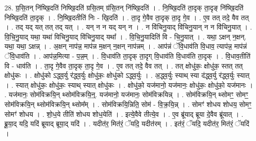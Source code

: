 \documentclass[17pt]{extarticle}
\begin{document}
28. ग्र॒सि॒तन् नि॑ष्खि॒दति॑ निष्खि॒दति॑ ग्रसि॒तम् ग्र॑सि॒तन् नि॑ष्खि॒दति॑ । . नि॒ष्खि॒दति॑ ता॒दृक् ता॒दृङ् नि॑ष्खि॒दति॑ निष्खि॒दति॑ ता॒दृक् । . नि॒ष्खि॒दतीति॑ निः - खि॒दति॑ । . ता॒दृ गे॒वैव ता॒दृक् ता॒दृ गे॒व । . ए॒व तत् तदे॒ वैव तत् । . तद् यद् यत् तत् तद् यत् । . यन् न न यद् यन् न । . न वि॑चिनु॒याद् वि॑चिनु॒यान् न न वि॑चिनु॒यात् । . वि॒चि॒नु॒याद् यथा॒ यथा॑ विचिनु॒याद् वि॑चिनु॒याद् यथा᳚ । . वि॒चि॒नु॒यादिति॑ वि - चि॒नु॒यात् । . यथा॒ ऽक्षन् न॒क्षन्. यथा॒ यथा॒ ऽक्षन्न् । . अ॒क्षन् नाप॑न्न॒ माप॑न्न म॒क्षन् न॒क्षन् नाप॑न्नम् । . आप॑न्नं ॅवि॒धाव॑ति वि॒धाव॒ त्याप॑न्न॒ माप॑न्नं ॅवि॒धाव॑ति । . आप॑न्न॒मित्या - प॒न्न॒म् । . वि॒धाव॑ति ता॒दृक् ता॒दृग् वि॒धाव॑ति वि॒धाव॑ति ता॒दृक् । . वि॒धाव॒तीति॑ वि - धाव॑ति । . ता॒दृ गे॒वैव ता॒दृक् ता॒दृ गे॒व । . ए॒व तत् तदे॒ वैव तत् । . तत् क्षोधु॑कः॒ क्षोधु॑क॒ स्तत् तत् क्षोधु॑कः । . क्षोधु॑को ऽद्ध्व॒र्यु र॑द्ध्व॒र्युः क्षोधु॑कः॒ क्षोधु॑को ऽद्ध्व॒र्युः । . अ॒द्ध्व॒र्युः स्याथ् स्या द॑द्ध्व॒र्यु र॑द्ध्व॒र्युः स्यात् । . स्यात् क्षोधु॑कः॒ क्षोधु॑कः॒ स्याथ् स्यात् क्षोधु॑कः । . क्षोधु॑को॒ यज॑मानो॒ यज॑मानः॒ क्षोधु॑कः॒ क्षोधु॑को॒ यज॑मानः । . यज॑मानः॒ सोम॑विक्रयि॒न् थ्सोम॑विक्रयि॒न्॒. यज॑मानो॒ यज॑मानः॒ सोम॑विक्रयिन्न् । . सोम॑विक्रयि॒न् थ्सोमꣳ॒॒ सोमꣳ॒॒ सोम॑विक्रयि॒न् थ्सोम॑विक्रयि॒न् थ्सोम᳚म् । . सोम॑विक्रयि॒न्निति॒ सोम॑ - वि॒क्र॒यि॒न्न् । . सोमꣳ॑ शोधय शोधय॒ सोमꣳ॒॒ सोमꣳ॑ शोधय । . शो॒ध॒ये तीति॑ शोधय शोध॒येति॑ । . इत्ये॒वैवे तीत्ये॒व । . ए॒व ब्रू॑याद् ब्रूया दे॒वैव ब्रू॑यात् । . ब्रू॒या॒द् यदि॒ यदि॑ ब्रूयाद् ब्रूया॒द् यदि॑ । . यदीत॑र॒ मित॑रं॒ ॅयदि॒ यदीत॑रम् । . इत॑रं॒ ॅयदि॒ यदीत॑र॒ मित॑रं॒ ॅयदि॑ । \newline
\end{document}
